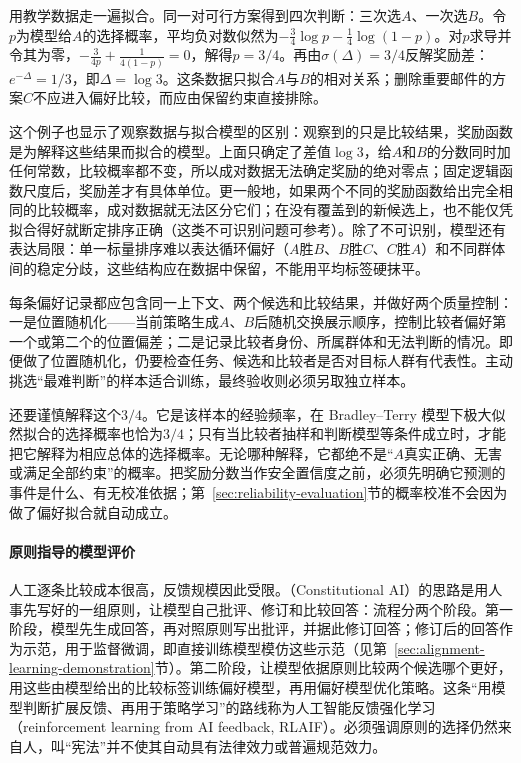 用教学数据走一遍拟合。同一对可行方案得到四次判断：三次选$A$、一次选$B$。令$p$为模型给$A$的选择概率，平均负对数似然为$-\tfrac34\log p-\tfrac14\log(1-p)$。对$p$求导并令其为零，$-\tfrac{3}{4p}+\tfrac{1}{4(1-p)}=0$，解得$p=3/4$。再由$\sigma(\Delta)=3/4$反解奖励差：$e^{-\Delta}=1/3$，即$\Delta=\log3$。这条数据只拟合$A$与$B$的相对关系；删除重要邮件的方案$C$不应进入偏好比较，而应由保留约束直接排除。

这个例子也显示了观察数据与拟合模型的区别：观察到的只是比较结果，奖励函数是为解释这些结果而拟合的模型。上面只确定了差值$\log3$，给$A$和$B$的分数同时加任何常数，比较概率都不变，所以成对数据无法确定奖励的绝对零点；固定逻辑函数尺度后，奖励差才有具体单位。更一般地，如果两个不同的奖励函数给出完全相同的比较概率，成对数据就无法区分它们；在没有覆盖到的新候选上，也不能仅凭拟合得好就断定排序正确（这类不可识别问题可参考）。除了不可识别，模型还有表达局限：单一标量排序难以表达循环偏好（$A$胜$B$、$B$胜$C$、$C$胜$A$）和不同群体间的稳定分歧，这些结构应在数据中保留，不能用平均标签硬抹平。

每条偏好记录都应包含同一上下文、两个候选和比较结果，并做好两个质量控制：一是位置随机化——当前策略生成$A$、$B$后随机交换展示顺序，控制比较者偏好第一个或第二个的位置偏差；二是记录比较者身份、所属群体和无法判断的情况。即便做了位置随机化，仍要检查任务、候选和比较者是否对目标人群有代表性。主动挑选“最难判断”的样本适合训练，最终验收则必须另取独立样本。

还要谨慎解释这个$3/4$。它是该样本的经验频率，在 Bradley--Terry 模型下极大似然拟合的选择概率也恰为$3/4$；只有当比较者抽样和判断模型等条件成立时，才能把它解释为相应总体的选择概率。无论哪种解释，它都绝不是“$A$真实正确、无害或满足全部约束”的概率。把奖励分数当作安全置信度之前，必须先明确它预测的事件是什么、有无校准依据；第~\ref{sec:reliability-evaluation}节的概率校准不会因为做了偏好拟合就自动成立。

\paragraph{原则指导的模型评价}

人工逐条比较成本很高，反馈规模因此受限。（Constitutional AI）的思路是用人事先写好的一组原则，让模型自己批评、修订和比较回答：流程分两个阶段。第一阶段，模型先生成回答，再对照原则写出批评，并据此修订回答；修订后的回答作为示范，用于监督微调，即直接训练模型模仿这些示范（见第~\ref{sec:alignment-learning-demonstration}节）。第二阶段，让模型依据原则比较两个候选哪个更好，用这些由模型给出的比较标签训练偏好模型，再用偏好模型优化策略。这条“用模型判断扩展反馈、再用于策略学习”的路线称为人工智能反馈强化学习（reinforcement learning from AI feedback, RLAIF）。必须强调原则的选择仍然来自人，叫“宪法”并不使其自动具有法律效力或普遍规范效力。

